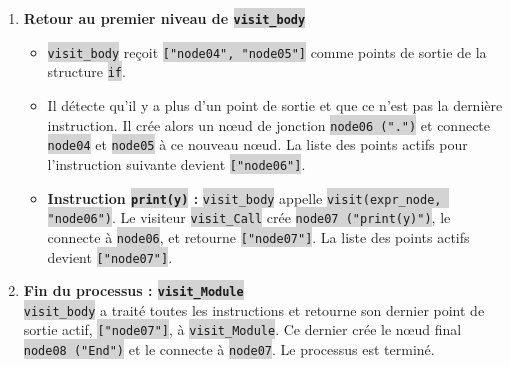 \documentclass[11pt,a4paper]{article}
\newcommand{\code}[1]{\colorbox{lightgray}{\texttt{\small #1}}}
\begin{document}
\begin{enumerate}
    \item \textbf{Retour au premier niveau de \code{visit\_body}}
    \begin{itemize}
        \item \code{visit\_body} reçoit \code{["node04", "node05"]} comme points de sortie de la structure \code{if}.
        \item Il détecte qu'il y a plus d'un point de sortie et que ce n'est pas la dernière instruction. Il crée alors un nœud de jonction \code{node06 (".")} et connecte \code{node04} et \code{node05} à ce nouveau nœud. La liste des points actifs pour l'instruction suivante devient \code{["node06"]}.
        \item \textbf{Instruction \code{print(y)} :} \code{visit\_body} appelle \code{visit(expr\_node, "node06")}. Le visiteur \code{visit\_Call} crée \code{node07 ("print(y)")}, le connecte à \code{node06}, et retourne \code{["node07"]}. La liste des points actifs devient \code{["node07"]}.
    \end{itemize}

    \item \textbf{Fin du processus : \code{visit\_Module}}\\
    \code{visit\_body} a traité toutes les instructions et retourne son dernier point de sortie actif, \code{["node07"]}, à \code{visit\_Module}. Ce dernier crée le nœud final \code{node08 ("End")} et le connecte à \code{node07}. Le processus est terminé.

\end{enumerate}
\end{document}

